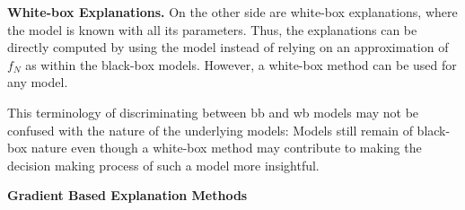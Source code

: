 \noindent\textbf{White-box Explanations.} On the other side are white-box explanations, where the model is known with all its parameters. Thus, the explanations can be directly computed by using the model instead of relying on an approximation of $f_N$ as within the black-box models. 
However, a white-box method can be used for any model. 

This terminology of discriminating between bb and wb models may not be confused with the nature of the underlying models: Models still remain of black-box nature even though a white-box method may contribute to making the decision making process of such a model more insightful. %







\noindent\textbf{Gradient Based Explanation Methods}
